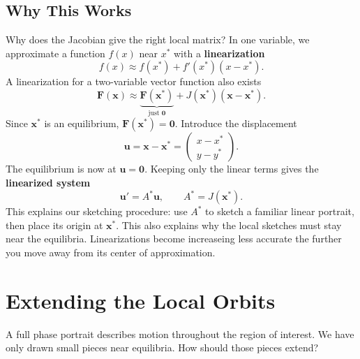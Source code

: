 \documentclass[10pt,letterpaper]{article}
\begin{document}
\subsection{Why This Works}
Why does the Jacobian give the right local matrix? In one variable, we approximate a function $f(x)$ near $x^*$ with a \textbf{linearization}
\[
f(x)\approx f(x^*)+f'(x^*)(x-x^*).
\]
A linearization for a two-variable vector function also exists
\[
\mathbf{F}(\mathbf{x})\approx
\underbrace{\mathbf{F}(\mathbf{x}^*)}_{\text{just }\textbf{0}}+J(\mathbf{x}^*)(\mathbf{x}-\mathbf{x}^*).
\]
Since $\textbf{x}^*$ is an equilibrium, $\mathbf{F}(\mathbf{x}^*)=\mathbf{0}$. Introduce the displacement
\[
\mathbf{u}=\mathbf{x}-\mathbf{x}^*
=\begin{pmatrix}x-x^*\\y-y^*\end{pmatrix}.
\]
The equilibrium is now at $\mathbf{u}=\mathbf{0}$. Keeping only the linear terms gives the \textbf{linearized system}
\[
\boxed{\mathbf{u}'=A^*\mathbf{u},\qquad A^*=J(\mathbf{x}^*).}
\]
This explains our sketching procedure: use $A^*$ to sketch a familiar linear portrait, then place its origin at $\mathbf{x}^*$. This also explains why the local sketches must stay near the equilibria. Linearizations become increaseing less accurate the further you move away from its center of approximation.


\section{Extending the Local Orbits}

A full phase portrait describes motion throughout the region of interest. We have only drawn small pieces near equilibria. How should those pieces extend?
\end{document}
